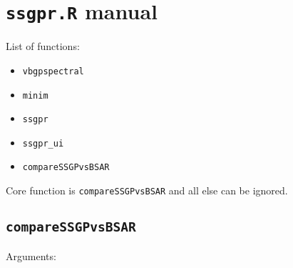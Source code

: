 \documentclass[11pt]{article}
\begin{document}
\section{\texttt{ssgpr.R} manual}
List of functions:
\begin{itemize}
  \item \texttt{vbgpspectral}
  \item \texttt{minim}
  \item \texttt{ssgpr}
  \item \texttt{ssgpr\_ui}
  \item \texttt{compareSSGPvsBSAR}
\end{itemize}

Core function is \texttt{compareSSGPvsBSAR} and all else can be ignored.
\subsection{\texttt{compareSSGPvsBSAR}}
  Arguments:
\end{document}
